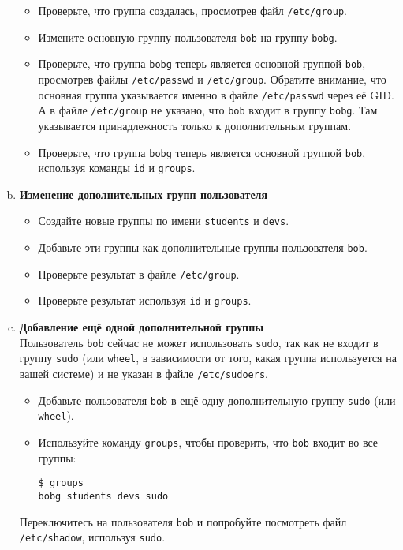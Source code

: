 \documentclass{article}
\begin{document}
\begin{enumerate}[a.]
\begin{itemize}
\item Проверьте, что группа создалась, просмотрев файл \texttt{/etc/group}.
\item Измените основную группу пользователя \texttt{bob} на группу \texttt{bobg}.
\item Проверьте, что группа \texttt{bobg} теперь является основной группой \texttt{bob}, просмотрев файлы \texttt{/etc/passwd} и \texttt{/etc/group}. Обратите внимание, что основная группа указывается именно в файле \texttt{/etc/passwd} через её GID. А в файле \texttt{/etc/group} не указано, что \texttt{bob} входит в группу \texttt{bobg}. Там указывается принадлежность только к дополнительным группам.
\item Проверьте, что группа \texttt{bobg} теперь является основной группой \texttt{bob}, используя команды \texttt{id} и \texttt{groups}.
\end{itemize}

\item \textbf{Изменение дополнительных групп пользователя}
\begin{itemize}
\item Создайте новые группы по имени \texttt{students} и \texttt{devs}.
\item Добавьте эти группы как дополнительные группы пользователя \texttt{bob}.
\item Проверьте результат в файле \texttt{/etc/group}.
\item Проверьте результат используя \texttt{id} и \texttt{groups}.
\end{itemize}


\item \textbf{Добавление ещё одной дополнительной группы}\\
Пользователь \texttt{bob} сейчас не может использовать \texttt{sudo}, так как не входит в группу \texttt{sudo} (или \texttt{wheel}, в зависимости от того, какая группа используется на вашей системе) и не указан в файле \texttt{/etc/sudoers}.
\begin{itemize}
\item Добавьте пользователя \texttt{bob} в ещё одну дополнительную группу \texttt{sudo} (или \texttt{wheel}).
\item Используйте команду \texttt{groups}, чтобы проверить, что \texttt{bob} входит во все группы:
\begin{lstlisting}
$ groups
bobg students devs sudo
\end{lstlisting}
\end{itemize}
Переключитесь на пользователя \texttt{bob} и попробуйте посмотреть файл \texttt{/etc/shadow}, используя \texttt{sudo}.


\end{enumerate}
\end{document}
